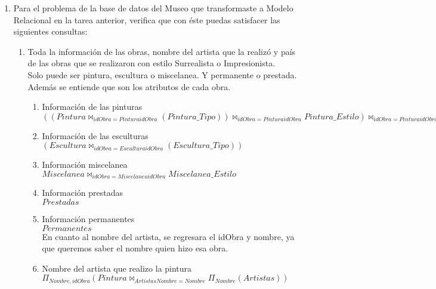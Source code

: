 \documentclass{article}
\author{Flores González Luis Brandon - 312218342 \\ García Argueta Jaime Daniel - 312104739 \\ Tarea 4. Algebra relacional}
\title{}
\date{29 de marzo de 2017}
\begin{document}
	\maketitle	
	
	\begin{enumerate}
		\item Para el problema de la base de datos del Museo que transformaste a Modelo Relacional
		en la tarea anterior, verifica que con éste puedas satisfacer las siguientes consultas:
			\begin{enumerate}
				\item Toda la información de las obras, nombre del artista que la realizó y país de las obras que se
				realizaron con estilo Surrealista o Impresionista.\\
				
				Solo puede ser pintura, escultura o miscelanea. Y permanente o prestada. Además se entiende que son los atributos de cada obra.\\
				
					\begin{enumerate}
						\item Información de las pinturas\\
						$((Pintura \bowtie_{idObra=PinturaidObra}(Pintura\_Tipo)) \bowtie_{idObra=PinturaidObra} Pintura\_Estilo) \bowtie_{idObra=PinturaidObra}(Pintura\_Material)$
						\item Información de las esculturas\\
						$(Escultura \bowtie_{idObra=EsculturaidObra}(Escultura\_Tipo))$
						\item Información miscelanea\\
						$Miscelanea \bowtie_{idObra=MiscelaneaidObra} Miscelanea\_Estilo$
						\item Información prestadas\\
						$Prestadas$
						\item Información permanentes\\
						$Permanentes$\\
						
						En cuanto al nombre del artista, se regresara el idObra y nombre, ya que queremos saber el nombre quien hizo esa obra.\\
						
						\item Nombre del artista que realizo la pintura\\
						
						$\Pi_{Nombre, idObra}(Pintura \bowtie_{ArtistasNombre=Nombre} \Pi_{Nombre}(Artistas))$
						

\end{enumerate}
\end{enumerate}
\end{enumerate}
\end{document}

